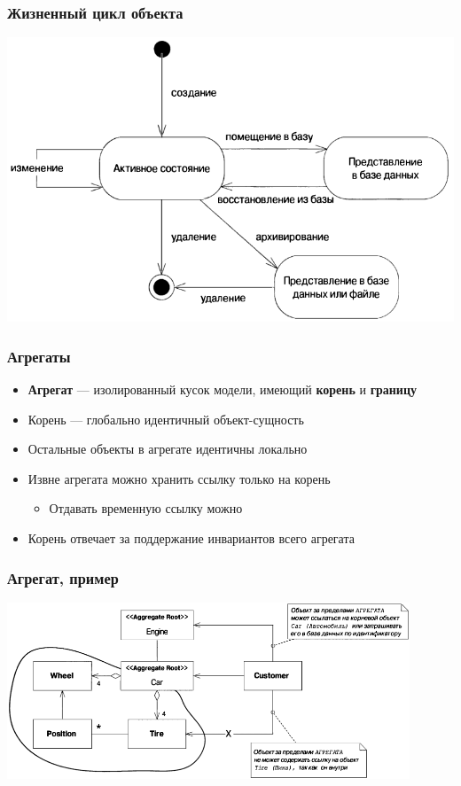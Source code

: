 \documentclass[xetex,mathserif,serif]{beamer}
\begin{document}
	\begin{frame}
		\frametitle{Жизненный цикл объекта}
		\begin{center}
			\includegraphics[height=0.7\textheight]{objectLifeCycle.png}
		\end{center}
	\end{frame}

	\begin{frame}
		\frametitle{Агрегаты}
		\begin{itemize}
			\item \textbf{Агрегат} --- изолированный кусок модели, имеющий \textbf{корень} и \textbf{границу}
			\item Корень --- глобально идентичный объект-сущность
			\item Остальные объекты в агрегате идентичны локально
			\item Извне агрегата можно хранить ссылку только на корень
			\begin{itemize}
				\item Отдавать временную ссылку можно
			\end{itemize}
			\item Корень отвечает за поддержание инвариантов всего агрегата
		\end{itemize}
	\end{frame}

	\begin{frame}
		\frametitle{Агрегат, пример}
		\begin{center}
			\includegraphics[width=0.9\textwidth]{aggregate.png}
		\end{center}
	\end{frame}
\end{document}
